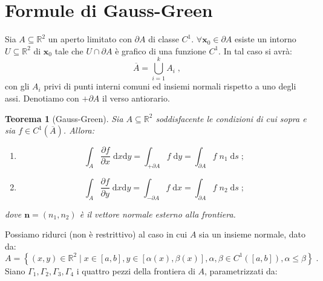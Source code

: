 \documentclass[a4paper,12pt]{report}
\theoremstyle{plain}
\newtheorem{thm}{Teorema}[section]
\theoremstyle{definition}
\theoremstyle{remark}
\newcommand{\diff}[1]{\mathrm{d}#1}
\numberwithin{equation}{section}
\begin{document}
\section{Formule di Gauss-Green}
Sia $A\subseteq\mathbb{R}^2$ un aperto limitato con $\partial A$ di classe $C^1$. $\forall \mathbf{x}_0\in\partial A$ esiste un intorno 
$U\subseteq\mathbb{R}^2$ di $\mathbf{x}_0$ tale che $U\cap\partial A$ è grafico di una funzione $C^1$. In tal caso si avrà:
\begin{equation}
\overline{A}=\bigcup_{i=1}^k A_i\;,
\end{equation}
con gli $A_i$ privi di punti interni comuni ed insiemi normali rispetto a uno degli assi. Denotiamo con $+\partial A$ il verso antiorario.
\begin{thm}[Gauss-Green]  Sia $A\subseteq\mathbb{R}^2$ soddisfacente le condizioni di cui sopra e sia $f\in C^1(\overline{A})$. Allora:
\begin{enumerate}
\item
\begin{equation}
\int_A \frac{\partial f}{\partial x}\;\diff{x}\diff{y}=\int_{+\partial A} f\;\diff{y}=\int_{\partial A} f\;n_1\;\diff{s}\;;
\end{equation}
\item
\begin{equation}
\int_A \frac{\partial f}{\partial y}\;\diff{x}\diff{y}=\int_{-\partial A} f\;\diff{x}=\int_{\partial A} f\;n_2\;\diff{s}\;;
\end{equation}
\end{enumerate}
dove $\mathbf{n}=(n_1,n_2)$ è il vettore normale esterno alla frontiera.
\end{thm}
\proof Possiamo ridurci (non è restrittivo) al caso in cui $A$ sia un insieme normale, dato da:
\begin{equation}
A=\left\{(x,y)\in\mathbb{R}^2\;|\; x\in[a,b],y\in[\alpha(x),\beta(x)],\alpha,\beta\in C^1([a,b]),\alpha\le\beta\right\}\;.
\end{equation}
Siano $\Gamma_1,\Gamma_2,\Gamma_3,\Gamma_4$ i quattro pezzi della frontiera di $A$, parametrizzati da:
\end{document}
